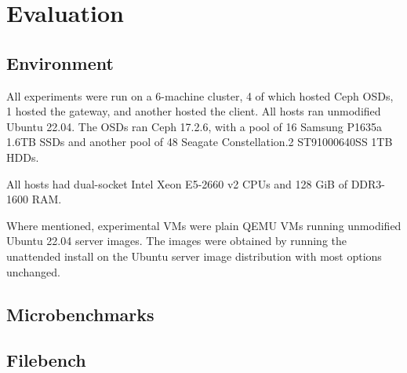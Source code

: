 \section{Evaluation}

\subsection{Environment}

All experiments were run on a 6-machine cluster, 4 of which hosted Ceph OSDs, 1
hosted the gateway, and another hosted the client. All hosts ran unmodified
Ubuntu 22.04. The OSDs ran Ceph 17.2.6, with a pool of 16 Samsung P1635a 1.6TB
SSDs and another pool of 48 Seagate Constellation.2 ST91000640SS 1TB HDDs.

All hosts had dual-socket Intel Xeon E5-2660 v2 CPUs and 128 GiB of DDR3-1600
RAM.

Where mentioned, experimental VMs were plain QEMU VMs running unmodified
Ubuntu 22.04 server images. The images were obtained by running the unattended
install on the Ubuntu server image distribution with most options unchanged.

\subsection{Microbenchmarks}

\subsection{Filebench}
